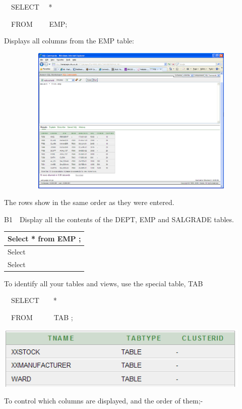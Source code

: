 \ \ SELECT \ \  * 

\ \  FROM \ \ \ \  EMP;

Displays all columns from the EMP table:

   
\includegraphics[width=14.785cm,height=7.089cm]{images/img (10).png}
 

The rows show in the same order as they were entered.

B1\ \ Display all the contents of the DEPT, EMP and SALGRADE tables.

\begin{flushleft}
\tablefirsthead{}
\tablehead{}
\tabletail{}
\tablelasttail{}
\begin{supertabular}{|m{14.405cm}|}
\hline
Select * from EMP ;\\\hline
Select\\\hline
Select\\\hline
\end{supertabular}
\end{flushleft}
To identify all your tables and views, use the special table, TAB

\ \ SELECT\ \ \ \  *

\ \ FROM\ \ \ \ \ \  TAB ;



\begin{center}
  
\includegraphics[width=12.298cm,height=2.992cm]{images/img (16).png}

\end{center}
To control which columns are displayed, and the order of them;-

